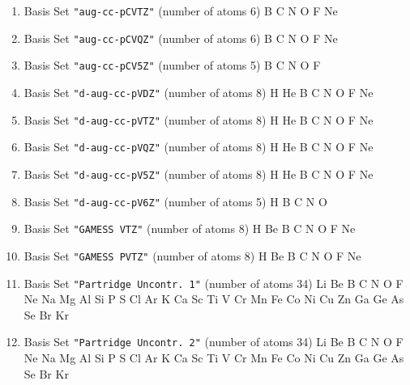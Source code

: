 \begin{enumerate}
\item Basis Set \verb#"aug-cc-pCVTZ"# (number of atoms 6)  \newline 
  B C N O F Ne


\item Basis Set \verb#"aug-cc-pCVQZ"# (number of atoms 6)  \newline 
  B C N O F Ne


\item Basis Set \verb#"aug-cc-pCV5Z"# (number of atoms 5)  \newline 
  B C N O F


\item Basis Set \verb#"d-aug-cc-pVDZ"# (number of atoms 8)  \newline 
  H He B C N O F Ne


\item Basis Set \verb#"d-aug-cc-pVTZ"# (number of atoms 8)  \newline 
  H He B C N O F Ne


\item Basis Set \verb#"d-aug-cc-pVQZ"# (number of atoms 8)  \newline 
  H He B C N O F Ne


\item Basis Set \verb#"d-aug-cc-pV5Z"# (number of atoms 8)  \newline 
  H He B C N O F Ne


\item Basis Set \verb#"d-aug-cc-pV6Z"# (number of atoms 5)  \newline 
  H B C N O


\item Basis Set \verb#"GAMESS VTZ"# (number of atoms 8)  \newline 
  H Be B C N O F Ne


\item Basis Set \verb#"GAMESS PVTZ"# (number of atoms 8)  \newline 
  H Be B C N O F Ne


\item Basis Set \verb#"Partridge Uncontr. 1"# (number of atoms 34)  \newline 
  Li Be B C N O F Ne Na Mg Al Si P S Cl Ar K Ca Sc Ti V Cr Mn Fe Co
 Ni Cu Zn Ga Ge As Se Br Kr


\item Basis Set \verb#"Partridge Uncontr. 2"# (number of atoms 34)  \newline 
  Li Be B C N O F Ne Na Mg Al Si P S Cl Ar K Ca Sc Ti V Cr Mn Fe Co
 Ni Cu Zn Ga Ge As Se Br Kr



\end{enumerate}
